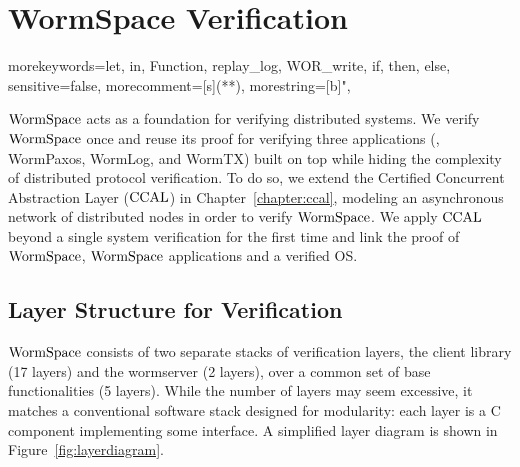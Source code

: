 \section{WormSpace Verification}
\label{sec:formal_verification}

{morekeywords={let, in, Function, replay_log, WOR_write, if, then, else},
sensitive=false,
morecomment=[s]{(*}{*)},
morestring=[b]",
}
%

	$\mathrm{WormSpace}$ acts as a foundation for verifying distributed systems. 
		We verify $\mathrm{WormSpace}$ once and reuse its proof for verifying three applications (\ie, WormPaxos, WormLog, and WormTX)
		built on top while  hiding the complexity of distributed protocol verification. 	
	To do so, we extend the Certified Concurrent Abstraction Layer ($\mathrm{CCAL}$)  in Chapter~\ref{chapter:ccal}, 
	modeling an asynchronous network of distributed nodes in order to verify $\mathrm{WormSpace}$. 
	We apply $\mathrm{CCAL}$ beyond a single system verification for the first time and link the proof of $\mathrm{WormSpace}$, 
	$\mathrm{WormSpace}$ applications and a verified OS. 

\subsection{Layer Structure for Verification}

$\mathrm{WormSpace}$ consists of two separate stacks of verification layers, the client library (17 layers) and the wormserver (2 layers), over a common set of base functionalities (5 layers). While the number of layers may seem excessive, it matches a conventional software stack designed for modularity: each layer is a C component implementing some interface. A simplified layer diagram is shown in Figure~\ref{fig:layerdiagram}.

